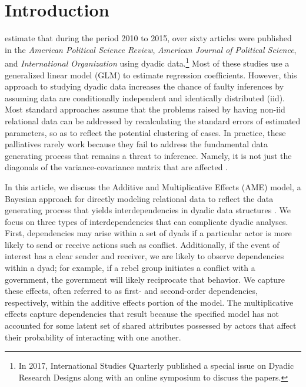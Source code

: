 \section{\textbf{Introduction}}

\citet{aronow:etal:2015} estimate that during the period 2010 to 2015, over sixty articles were published in the \textit{American Political Science Review}, \textit{American Journal of Political Science}, and \textit{International Organization} using dyadic data.\footnote{In 2017, International Studies Quarterly published a special issue on Dyadic Research Designs along with an online symposium to discuss the papers.} Most of these studies use a generalized linear model (GLM) to estimate regression coefficients.  However, this approach to studying dyadic data increases the chance of faulty inferences by assuming data are conditionally independent and identically distributed (iid). Most standard approaches assume that the problems raised by having non-iid relational data can be addressed by recalculating the standard errors of estimated parameters, so as to reflect the potential clustering of cases. In practice, these palliatives rarely work because they fail to address the fundamental data generating process that remains a threat to inference. Namely, it is not just the diagonals of the variance-covariance matrix that are affected \citep{beck:2012, king:roberts:2014}. %

In this article, we discuss the Additive and Multiplicative Effects (AME) model, a Bayesian approach for directly modeling relational data to reflect the data generating process that yields interdependencies in dyadic data structures \citep{hoff:2008,minhas:etal:2016:arxiv}. We focus on three types of interdependencies that can complicate dyadic analyses. First, dependencies may arise within a set of dyads if a particular actor is more likely to send or receive actions such as conflict. Additionally, if the event of interest has a clear sender and receiver, we are likely to observe dependencies within a dyad; for example, if a rebel group initiates a conflict with a government, the government will likely reciprocate that behavior. We capture these effects, often referred to as first- and second-order dependencies, respectively, within the additive effects portion of the model. The multiplicative effects capture dependencies that result because the specified model has not accounted for some latent set of shared attributes possessed by actors that affect their probability of interacting with one another. %

